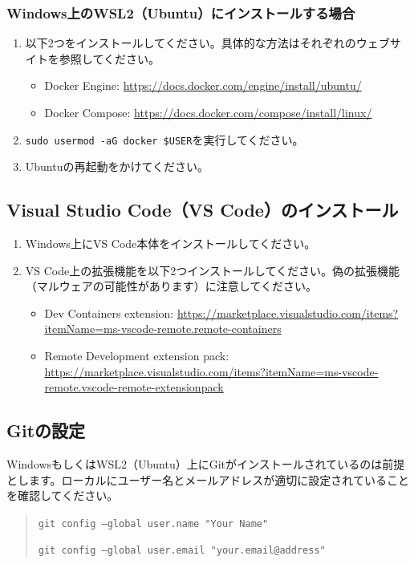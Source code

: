\subsubsection{Windows上のWSL2（Ubuntu）にインストールする場合}
\begin{enumerate}
    \item 以下2つをインストールしてください。具体的な方法はそれぞれのウェブサイトを参照してください。
    \begin{itemize}
        \item Docker Engine: \url{https://docs.docker.com/engine/install/ubuntu/}
        \item Docker Compose: \url{https://docs.docker.com/compose/install/linux/}
    \end{itemize}
    \item \texttt{sudo usermod -aG docker \$USER}を実行してください。
    \item Ubuntuの再起動をかけてください。
\end{enumerate}

\subsection{Visual Studio Code（VS Code）のインストール}
\begin{enumerate}
    \item Windows上にVS Code本体をインストールしてください。
    \item VS Code上の拡張機能を以下2つインストールしてください。偽の拡張機能（マルウェアの可能性があります）に注意してください。
    \begin{itemize}
        \item Dev Containers extension: \url{https://marketplace.visualstudio.com/items?itemName=ms-vscode-remote.remote-containers}
        \item Remote Development extension pack: \url{https://marketplace.visualstudio.com/items?itemName=ms-vscode-remote.vscode-remote-extensionpack}
    \end{itemize}
\end{enumerate}

\subsection{Gitの設定}
WindowsもしくはWSL2（Ubuntu）上にGitがインストールされているのは前提とします。ローカルにユーザー名とメールアドレスが適切に設定されていることを確認してください。
\begin{quote}
    \texttt{git config --global user.name "Your Name"}

    \texttt{git config --global user.email "your.email@address"}
\end{quote}

